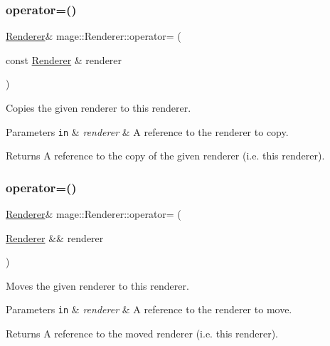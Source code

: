 \subsubsection{\texorpdfstring{operator=()}{operator=()}\hspace{0.1cm}{\footnotesize\ttfamily [1/2]}}
{\footnotesize\ttfamily \hyperlink{classmage_1_1_renderer}{Renderer}\& mage\+::\+Renderer\+::operator= (\begin{DoxyParamCaption}\item[{const \hyperlink{classmage_1_1_renderer}{Renderer} \&}]{renderer }\end{DoxyParamCaption})\hspace{0.3cm}{\ttfamily [delete]}}

Copies the given renderer to this renderer.


\begin{DoxyParams}[1]{Parameters}
\mbox{\tt in}  & {\em renderer} & A reference to the renderer to copy. \\
\hline
\end{DoxyParams}
\begin{DoxyReturn}{Returns}
A reference to the copy of the given renderer (i.\+e. this renderer). 
\end{DoxyReturn}
\hypertarget{classmage_1_1_renderer_aa381bb89bffdc8ea2d8e3625e28cd28a}{}\label{classmage_1_1_renderer_aa381bb89bffdc8ea2d8e3625e28cd28a} 
\subsubsection{\texorpdfstring{operator=()}{operator=()}\hspace{0.1cm}{\footnotesize\ttfamily [2/2]}}
{\footnotesize\ttfamily \hyperlink{classmage_1_1_renderer}{Renderer}\& mage\+::\+Renderer\+::operator= (\begin{DoxyParamCaption}\item[{\hyperlink{classmage_1_1_renderer}{Renderer} \&\&}]{renderer }\end{DoxyParamCaption})\hspace{0.3cm}{\ttfamily [delete]}}

Moves the given renderer to this renderer.


\begin{DoxyParams}[1]{Parameters}
\mbox{\tt in}  & {\em renderer} & A reference to the renderer to move. \\
\hline
\end{DoxyParams}
\begin{DoxyReturn}{Returns}
A reference to the moved renderer (i.\+e. this renderer). 
\end{DoxyReturn}
\hypertarget{classmage_1_1_renderer_a6dba3f3b9a1d3d8ed84d6ea3bec17058}{}\label{classmage_1_1_renderer_a6dba3f3b9a1d3d8ed84d6ea3bec17058} 
